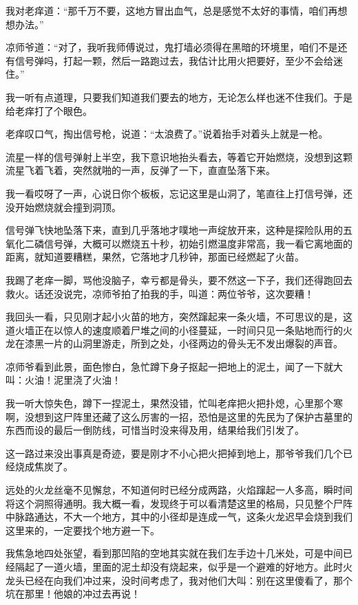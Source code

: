 我对老痒道：“那千万不要，这地方冒出血气，总是感觉不太好的事情，咱们再想想办法。”

凉师爷道：“对了，我听我师傅说过，鬼打墙必须得在黑暗的环境里，咱们不是还有信号弹吗，打起一颗，然后一路跑过去，我估计比用火把要好，至少不会给迷住。”

我一听有点道理，只要我们知道我们要去的地方，无论怎么样也迷不住我们。于是给老痒打了个眼色。

老痒叹口气，掏出信号枪，说道：“太浪费了。”说着抬手对着头上就是一枪。

流星一样的信号弹射上半空，我下意识地抬头看去，等着它开始燃烧，没想到这颗流星飞着飞着，突然就啪的一声，反弹了一下，直直坠落下来。

我一看哎呀了一声，心说日你个板板，忘记这里是山洞了，笔直往上打信号弹，还没开始燃烧就会撞到洞顶。

信号弹飞快地坠落下来，直到几乎落地才噗地一声绽放开来，这种是探险队用的五氧化二磷信号弹，大概可以燃烧五十秒，初始引燃温度非常高，我一看它离地面的距离，就知道要糟糕，果然，它落地才几秒钟，那面已经燃起了火苗。

我踢了老痒一脚，骂他没脑子，幸亏都是骨头，要不然这一下子，我们还得跑回去救火。话还没说完，凉师爷拍了拍我的手，叫道：两位爷爷，这次要糟！

我回头一看，只见刚才起小火苗的地方，突然蹿起来一条火墙，不可思议的是，这道火墙正在以惊人的速度顺着尸堆之间的小径蔓延，一时间只见一条贴地而行的火龙在漆黑一片的山洞里游走，所到之处，小径两边的骨头无不发出爆裂的声音。

凉师爷看到此景，面色惨白，急忙蹲下身子抠起一把地上的泥土，闻了一下就大叫：火油！泥里浇了火油！

我一听大惊失色，蹲下一捏泥土，果然没错，忙叫老痒把火把扑熄，心里那个寒啊，没想到这尸阵里还藏了这么厉害的一招，恐怕是这里的先民为了保护古墓里的东西而设的最后一倒防线，可惜当时没来得及用，结果给我们引发了。

这一路过来没出事真是奇迹，要是刚才不小心把火把掉到地上，那爷爷我们几个已经烧成焦炭了。

远处的火龙丝毫不见懈怠，不知道何时已经分成两路，火焰蹿起一人多高，瞬时间将这个洞照得通明。我大概一看，发现终于可以看清楚这里的格局，只见整个尸阵中脉路通达，不大一个地方，其中的小径却是连成一气，这条火龙迟早会烧到我们这里来的，一定要找个地方避一下。

我焦急地四处张望，看到那凹陷的空地其实就在我们左手边十几米处，可是中间已经隔起了一道火墙，里面的泥土却没有烧起来，似乎是一个避难的好地方。此时火龙头已经在向我们冲过来，没时间考虑了，我对他们大叫：别在这里傻看了，那个坑在那里！他娘的冲过去再说！

